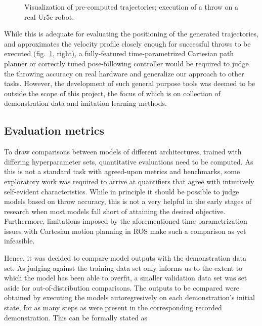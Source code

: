 \documentclass{article}
\begin{document}
\begin{figure}
	\centering
	\caption{Visualization of pre-computed trajectories; execution of a throw on a real Ur5e robot.}
	\label{fig:vis_exec}
\end{figure}

While this is adequate for evaluating the positioning of the generated trajectories, and approximates the velocity profile closely enough for successful throws to be executed (fig.~\ref{fig:vis_exec}, right), a fully-featured time-parametrized Cartesian path planner or correctly tuned pose-following controller would be required to judge the throwing accuracy on real hardware and generalize our approach to other tasks. However, the development of such general purpose tools was deemed to be outside the scope of this project, the focus of which is on collection of demonstration data and imitation learning methods.

\subsection{Evaluation metrics}
\label{sec:eval}

To draw comparisons between models of different architectures, trained with differing hyperparameter sets, quantitative evaluations need to be computed. As this is not a standard task with agreed-upon metrics and benchmarks, some exploratory work was required to arrive at quantifiers that agree with intuitively self-evident characteristics. While in principle it should be possible to judge models based on throw accuracy, this is not a very helpful in the early stages of research when most models fall short of attaining the desired objective. Furthermore, limitations imposed by the aforementioned time parametrization issues with Cartesian motion planning in ROS make such a comparison as yet infeasible.

Hence, it was decided to compare model outputs with the demonstration data set. As judging against the training data set only informs us to the extent to which the model has been able to overfit, a smaller validation data set was set aside for out-of-distribution comparisons. The outputs to be compared were obtained by executing the models autoregresively on each demonstration's initial state, for as many steps as were present in the corresponding recorded demonstration. This can be formally stated as
\end{document}
